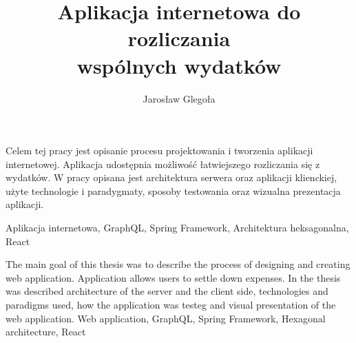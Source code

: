 \documentclass[
    left=2.5cm,         %
    right=2.5cm,        %
    top=2.5cm,          %
    bottom=3cm,         %
    bindingoffset=6mm,  %
    nohyphenation=false %
]{eiti/eiti-thesis}
\begin{document}
\EngineerThesis %
{}
\title{
    Aplikacja internetowa do rozliczania\\ wspólnych wydatków
}
\author{Jarosław Glegoła}
\date{\the\year}
\maketitle

\cleardoublepage %
\streszczenie Celem tej pracy jest opisanie procesu projektowania i tworzenia aplikacji internetowej. Aplikacja udostępnia możliwość łatwiejszego rozliczania się z wydatków. W pracy opisana jest architektura serwera oraz aplikacji klienckiej, użyte technologie i paradygmaty, sposoby testowania oraz wizualna prezentacja aplikacji.

\slowakluczowe Aplikacja internetowa, GraphQL, Spring Framework, Architektura heksagonalna, React

\newpage
\abstract The main goal of this thesis was to describe the process of designing and creating web application. Application allows users to settle down expenses. In the thesis was described architecture of the server and the client side, technologies and paradigms used, how the application was testeg and visual presentation of the web application.
\keywords Web application, GraphQL, Spring Framework, Hexagonal architecture, React

\cleardoublepage  %
\pagestyle{plain}
\makeauthorship

\cleardoublepage %
\tableofcontents

\cleardoublepage %
\pagestyle{headings}
\end{document}
